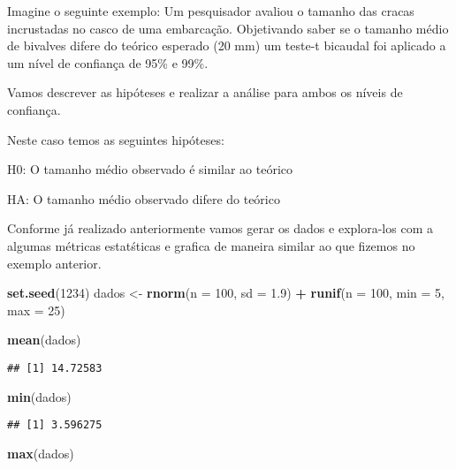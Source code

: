 \documentclass[]{book}
\newenvironment{Shaded}{\begin{snugshade}}{\end{snugshade}}
\newcommand{\DataTypeTok}[1]{\textcolor[rgb]{0.13,0.29,0.53}{#1}}
\newcommand{\DecValTok}[1]{\textcolor[rgb]{0.00,0.00,0.81}{#1}}
\newcommand{\FloatTok}[1]{\textcolor[rgb]{0.00,0.00,0.81}{#1}}
\newcommand{\KeywordTok}[1]{\textcolor[rgb]{0.13,0.29,0.53}{\textbf{#1}}}
\newcommand{\NormalTok}[1]{#1}
\newcommand{\OperatorTok}[1]{\textcolor[rgb]{0.81,0.36,0.00}{\textbf{#1}}}
\newcommand{\StringTok}[1]{\textcolor[rgb]{0.31,0.60,0.02}{#1}}
\begin{document}
Imagine o seguinte exemplo: Um pesquisador avaliou o tamanho das cracas incrustadas no casco de uma embarcação. Objetivando saber se o tamanho médio de bivalves difere do teórico esperado (20 mm) um teste-t bicaudal foi aplicado a um nível de confiança de 95\% e 99\%.

Vamos descrever as hipóteses e realizar a análise para ambos os níveis de confiança.

Neste caso temos as seguintes hipóteses:

H0: O tamanho médio observado é similar ao teórico

HA: O tamanho médio observado difere do teórico

Conforme já realizado anteriormente vamos gerar os dados e explora-los com a algumas métricas estatśticas e grafica de maneira similar ao que fizemos no exemplo anterior.

\begin{Shaded}
\begin{Highlighting}[]
\KeywordTok{set.seed}\NormalTok{(}\DecValTok{1234}\NormalTok{)}
\NormalTok{dados <-}\StringTok{ }\KeywordTok{rnorm}\NormalTok{(}\DataTypeTok{n =} \DecValTok{100}\NormalTok{, }\DataTypeTok{sd =} \FloatTok{1.9}\NormalTok{) }\OperatorTok{+}\StringTok{ }\KeywordTok{runif}\NormalTok{(}\DataTypeTok{n =} \DecValTok{100}\NormalTok{, }\DataTypeTok{min =} \DecValTok{5}\NormalTok{, }\DataTypeTok{max =} \DecValTok{25}\NormalTok{)}

\KeywordTok{mean}\NormalTok{(dados)}
\end{Highlighting}
\end{Shaded}

\begin{verbatim}
## [1] 14.72583
\end{verbatim}

\begin{Shaded}
\begin{Highlighting}[]
\KeywordTok{min}\NormalTok{(dados)}
\end{Highlighting}
\end{Shaded}

\begin{verbatim}
## [1] 3.596275
\end{verbatim}

\begin{Shaded}
\begin{Highlighting}[]
\KeywordTok{max}\NormalTok{(dados)}
\end{Highlighting}
\end{Shaded}
\end{document}
